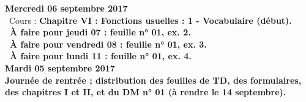 \documentclass[12pt,a4paper]{article}
\begin{document}
\noindent\textbf{\bf Mercredi 06 septembre 2017}\\
\bu\ Cours : \bf Chapitre VI \rm : Fonctions usuelles : 1 - Vocabulaire (début).\\
\bu\ À faire pour jeudi 07 : feuille n° 01, ex. 2.\\
\bu\ À faire pour vendredi 08 : feuille n° 01, ex. 3.\\
\bu\ À faire pour lundi 11 : feuille n° 01, ex. 4.\vspace{.4cm}\\

\noindent\textbf{\bf Mardi 05 septembre 2017}\\
Journée de rentrée ; distribution des feuilles de TD, des formulaires, des
chapitres I et II, et du DM n° 01 (à rendre le 14 septembre).\vspace{.4cm}\\


\label{end}
\end{document}
